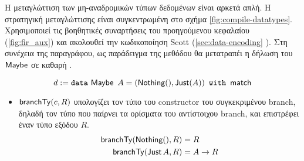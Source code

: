 
Η μεταγλώττιση των μη-αναδρομικών τύπων δεδομένων είναι αρκετά απλή.  Η
στρατηγική μεταγλώττισης είναι συγκεντρωμένη στο σχήμα
\ref{fig:compile-datatypes}.  Χρησιμοποιεί τις βοηθητικές συναρτήσεις του
προηγούμενου κεφαλαίου (\ref{fig:fir_aux}) και ακολουθεί την κωδικοποίηση Scott
(\ref{sec:data-encoding} ). Στη συνέχεια της παραγράφου, ως παράδειγμα της
μεθόδου θα μετατραπέι η \FIR{} δήλωση του $\operatorname{\textsf{Maybe}}$ σε καθαρή \FOMF{}.


\begin{displaymath} d := \operatorname{\texttt{data}}{} \operatorname{\textsf{Maybe}} ~ A = (\operatorname{\textsf{Nothing}} (), \operatorname{\textsf{Just}}
(A)) ~ \operatorname{\texttt{with}} ~ \operatorname{\textsf{match}} \end{displaymath} \begin{itemize} \item $\mathsf{branchTy}(c, R)$ υπολογίζει τον
      τύπο του constructor του συγκεκριμένου branch, δηλαδή τον τύπο που
      παίρνει τα ορίσματα του αντίστοιχου branch, και επιστρέφει έναν τύπο
      εξόδου $R$.
  \begin{align*} \mathsf{branchTy}(\operatorname{\textsf{Nothing}} (), R) &= R\\ \mathsf{branchTy}(\operatorname{\textsf{Just}} A, R) &= A
  \rightarrow R \end{align*}


\end{itemize}
